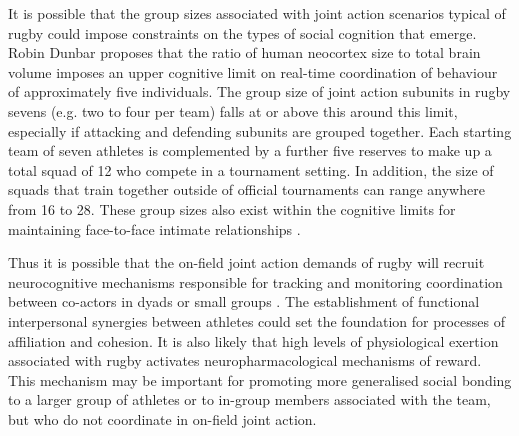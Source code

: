 \begin{CJK}{UTF8}{gbsn}
It is possible that the group sizes associated with joint action scenarios typical of rugby could impose constraints on the types of social cognition that emerge.  Robin Dunbar \textcite{Dunbar1992} proposes that the ratio of human neocortex size to total brain volume imposes an upper cognitive limit on real-time coordination of behaviour of approximately five individuals.  The group size of joint action subunits in rugby sevens (e.g. two to four per team) falls at or above this around this limit, especially if attacking and defending subunits are grouped together.  Each starting team of seven athletes is complemented by a further five reserves to make up a total squad of 12 who compete in a tournament setting.  In addition, the size of squads that train together outside of official tournaments can range anywhere from 16 to 28.  These group sizes also exist within the cognitive limits for maintaining face-to-face intimate relationships \citep[thought to be in the realm of 15-25, see][]{Dunbar1992,Dunbar2010}.

Thus it is possible that the on-field joint action demands of rugby will recruit neurocognitive mechanisms responsible for tracking and monitoring coordination between co-actors in dyads or small groups \citep{Mogan2017}. The establishment of functional interpersonal synergies between athletes could set the foundation for processes of affiliation and cohesion\citep{Marsh2009}.  It is also likely that high levels of physiological exertion associated with rugby activates neuropharmacological mechanisms of reward.  This mechanism may be important for promoting more generalised social bonding to a larger group of athletes or to in-group members associated with the team, but who do not coordinate in on-field joint action.



\end{CJK}
